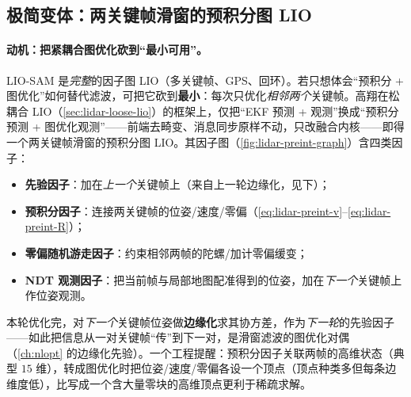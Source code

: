 \subsection{极简变体：两关键帧滑窗的预积分图 LIO}
\label{sec:lidar-preint-graph}

\paragraph{动机：把紧耦合图优化砍到“最小可用”。}
LIO-SAM 是\emph{完整}的因子图 LIO（多关键帧、GPS、回环）。若只想体会“预积分 + 图优化”如何替代滤波，可把它砍到\textbf{最小}：每次只优化\emph{相邻两个}关键帧\cite{gao2023slamad}。高翔在松耦合 LIO（\cref{sec:lidar-loose-lio}）的框架上，仅把“EKF 预测 + 观测”换成“预积分预测 + 图优化观测”——前端去畸变、消息同步原样不动，只改融合内核——即得一个两关键帧滑窗的预积分图 LIO。其因子图（\cref{fig:lidar-preint-graph}）含四类因子：
\begin{itemize}
  \item \textbf{先验因子}：加在\emph{上一个}关键帧上（来自上一轮边缘化，见下）；
  \item \textbf{预积分因子}：连接两关键帧的位姿/速度/零偏（\cref{eq:lidar-preint-v}--\cref{eq:lidar-preint-R}）；
  \item \textbf{零偏随机游走因子}：约束相邻两帧的陀螺/加计零偏缓变；
  \item \textbf{NDT 观测因子}：把当前帧与局部地图配准得到的位姿，加在\emph{下一个}关键帧上作位姿观测。
\end{itemize}
本轮优化完，对\emph{下一个}关键帧位姿做\textbf{边缘化}求其协方差，作为\emph{下一轮}的先验因子——如此把信息从一对关键帧“传”到下一对，是滑窗滤波的图优化对偶（\cref{ch:nlopt} 的边缘化先验）。一个工程提醒：预积分因子关联两帧的高维状态（典型 $15$ 维），转成图优化时把位姿/速度/零偏各设一个顶点（顶点种类多但每条边维度低），比写成一个含大量零块的高维顶点更利于稀疏求解。

